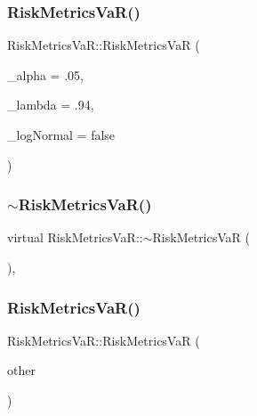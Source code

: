 \subsubsection{\texorpdfstring{Risk\+Metrics\+Va\+R()}{RiskMetricsVaR()}\hspace{0.1cm}{\footnotesize\ttfamily [1/2]}}
{\footnotesize\ttfamily Risk\+Metrics\+Va\+R\+::\+Risk\+Metrics\+VaR (\begin{DoxyParamCaption}\item[{double}]{\+\_\+alpha = {\ttfamily .05},  }\item[{double}]{\+\_\+lambda = {\ttfamily .94},  }\item[{bool}]{\+\_\+log\+Normal = {\ttfamily false} }\end{DoxyParamCaption})}

\hypertarget{classRiskMetricsVaR_a97ad6e0fe38cfef62f10da67d542bdd0}{}\label{classRiskMetricsVaR_a97ad6e0fe38cfef62f10da67d542bdd0} 
\subsubsection{\texorpdfstring{$\sim$\+Risk\+Metrics\+Va\+R()}{~RiskMetricsVaR()}}
{\footnotesize\ttfamily virtual Risk\+Metrics\+Va\+R\+::$\sim$\+Risk\+Metrics\+VaR (\begin{DoxyParamCaption}{ }\end{DoxyParamCaption})\hspace{0.3cm}{\ttfamily [inline]}, {\ttfamily [virtual]}}

\hypertarget{classRiskMetricsVaR_a296438226de45455204287f234034935}{}\label{classRiskMetricsVaR_a296438226de45455204287f234034935} 
\subsubsection{\texorpdfstring{Risk\+Metrics\+Va\+R()}{RiskMetricsVaR()}\hspace{0.1cm}{\footnotesize\ttfamily [2/2]}}
{\footnotesize\ttfamily Risk\+Metrics\+Va\+R\+::\+Risk\+Metrics\+VaR (\begin{DoxyParamCaption}\item[{const \hyperlink{classRiskMetricsVaR}{Risk\+Metrics\+VaR} \&}]{other }\end{DoxyParamCaption})}



